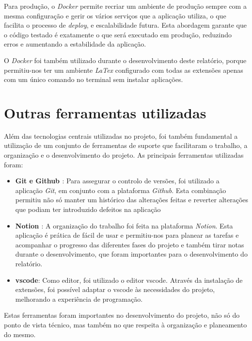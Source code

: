 Para produção, o \textit{Docker} permite recriar um ambiente de produção sempre com a mesma configuração e gerir os vários serviços que a aplicação utiliza, o que facilita o processo de \textit{deploy}, e escalabilidade futura. Esta abordagem garante que o código testado é exatamente o que será executado em produção, reduzindo erros e aumentando a estabilidade da aplicação.

O \textit{Docker}\cite{docker} foi também utilizado durante o desenvolvimento deste relatório, porque permitiu-nos ter um ambiente \textit{LaTex} configurado com todas as extensões apenas com um único comando no terminal sem instalar aplicações.

\section{Outras ferramentas utilizadas}
\label{sec:tools}

Além das tecnologias centrais utilizadas no projeto, foi também fundamental a utilização de um conjunto de ferramentas de suporte que facilitaram o trabalho, a organização e o desenvolvimento do projeto. As principais ferramentas utilizadas foram:

\begin{itemize}
    \item \textbf{Git \cite{git} e Github \cite{github}}: Para assegurar o controlo de versões, foi utilizado a aplicação \textit{Git}, em conjunto com a plataforma \textit{Github}. Esta combinação permitiu não só manter um histórico das alterações feitas e reverter alterações que podiam ter introduzido defeitos na aplicação

    \item \textbf{Notion \cite{notion}}: A organização do trabalho foi feita na plataforma \textit{Notion}. Esta aplicação é prática de fácil de usar e permitiu-nos para planear as tarefas e acompanhar o progresso das diferentes fases do projeto e também tirar notas durante o desenvolvimento, que foram importantes para o desenvolvimento do relatório.

    \item \textbf{\gls{vscode}\cite{vscode}}: Como editor, foi utilizado o editor \gls{vscode}. Através da instalação de extensões, foi possível adaptar o \gls{vscode} às necessidades do projeto, melhorando a experiência de programação.
\end{itemize}

Estas ferramentas foram importantes no desenvolvimento do projeto, não só do ponto de vista técnico, mas também no que respeita à organização e planeamento do mesmo.
